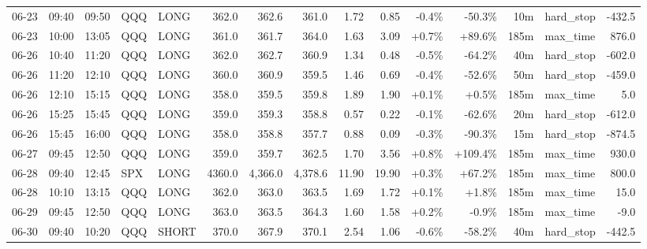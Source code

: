 \documentclass[11pt,a4paper,twoside]{article}
\begin{document}
\begin{landscape}
\begin{center}
\begin{longtable}{>{\color{txtmain}}l l l l l r r r r r r r r >{\color{txtmain}}l r}
06-23 & 09:40 & 09:50 & QQQ & LONG & 362.0 & 362.6 & 361.0 & 1.72 & 0.85 & \textcolor{lossred}{-0.4\%} & \textcolor{lossred}{-50.3\%} & 10m & hard\_stop & \textcolor{lossred}{-432.5} \\
06-23 & 10:00 & 13:05 & QQQ & LONG & 361.0 & 361.7 & 364.0 & 1.63 & 3.09 & \textcolor{wingreen}{+0.7\%} & \textcolor{wingreen}{+89.6\%} & 185m & max\_time & \textcolor{wingreen}{876.0} \\
06-26 & 10:40 & 11:20 & QQQ & LONG & 362.0 & 362.7 & 360.9 & 1.34 & 0.48 & \textcolor{lossred}{-0.5\%} & \textcolor{lossred}{-64.2\%} & 40m & hard\_stop & \textcolor{lossred}{-602.0} \\
06-26 & 11:20 & 12:10 & QQQ & LONG & 360.0 & 360.9 & 359.5 & 1.46 & 0.69 & \textcolor{lossred}{-0.4\%} & \textcolor{lossred}{-52.6\%} & 50m & hard\_stop & \textcolor{lossred}{-459.0} \\
06-26 & 12:10 & 15:15 & QQQ & LONG & 358.0 & 359.5 & 359.8 & 1.89 & 1.90 & \textcolor{wingreen}{+0.1\%} & \textcolor{wingreen}{+0.5\%} & 185m & max\_time & \textcolor{wingreen}{5.0} \\
06-26 & 15:25 & 15:45 & QQQ & LONG & 359.0 & 359.3 & 358.8 & 0.57 & 0.22 & \textcolor{lossred}{-0.1\%} & \textcolor{lossred}{-62.6\%} & 20m & hard\_stop & \textcolor{lossred}{-612.0} \\
06-26 & 15:45 & 16:00 & QQQ & LONG & 358.0 & 358.8 & 357.7 & 0.88 & 0.09 & \textcolor{lossred}{-0.3\%} & \textcolor{lossred}{-90.3\%} & 15m & hard\_stop & \textcolor{lossred}{-874.5} \\
06-27 & 09:45 & 12:50 & QQQ & LONG & 359.0 & 359.7 & 362.5 & 1.70 & 3.56 & \textcolor{wingreen}{+0.8\%} & \textcolor{wingreen}{+109.4\%} & 185m & max\_time & \textcolor{wingreen}{930.0} \\
06-28 & 09:40 & 12:45 & SPX & LONG & 4360.0 & 4,366.0 & 4,378.6 & 11.90 & 19.90 & \textcolor{wingreen}{+0.3\%} & \textcolor{wingreen}{+67.2\%} & 185m & max\_time & \textcolor{wingreen}{800.0} \\
06-28 & 10:10 & 13:15 & QQQ & LONG & 362.0 & 363.0 & 363.5 & 1.69 & 1.72 & \textcolor{wingreen}{+0.1\%} & \textcolor{wingreen}{+1.8\%} & 185m & max\_time & \textcolor{wingreen}{15.0} \\
06-29 & 09:45 & 12:50 & QQQ & LONG & 363.0 & 363.5 & 364.3 & 1.60 & 1.58 & \textcolor{wingreen}{+0.2\%} & \textcolor{lossred}{-0.9\%} & 185m & max\_time & \textcolor{lossred}{-9.0} \\
06-30 & 09:40 & 10:20 & QQQ & SHORT & 370.0 & 367.9 & 370.1 & 2.54 & 1.06 & \textcolor{lossred}{-0.6\%} & \textcolor{lossred}{-58.2\%} & 40m & hard\_stop & \textcolor{lossred}{-442.5} \\

\end{longtable}
\end{center}
\end{landscape}
\end{document}
